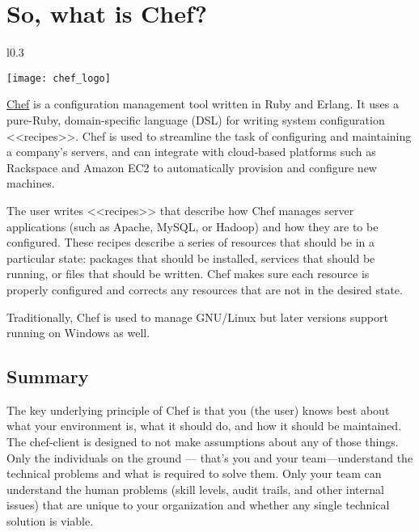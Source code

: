 \chapter{So, what is Chef?}

\begin{wrapfigure}{l}{0.3\textwidth}
  \vspace{-20pt}
  \begin{center}
    \texttt{[image: chef\_logo]}
  \end{center}
  \vspace{-20pt}
\end{wrapfigure}

\href{http://www.getchef.com/}{Chef} is a configuration management tool written in Ruby and Erlang. It uses a pure-Ruby, domain-specific language (DSL) for writing system configuration <<recipes>>. Chef is used to streamline the task of configuring and maintaining a company's servers, and can integrate with cloud-based platforms such as Rackspace and Amazon EC2 to automatically provision and configure new machines.

The user writes <<recipes>> that describe how Chef manages server applications (such as Apache, MySQL, or Hadoop) and how they are to be configured. These recipes describe a series of resources that should be in a particular state: packages that should be installed, services that should be running, or files that should be written. Chef makes sure each resource is properly configured and corrects any resources that are not in the desired state.

Traditionally, Chef is used to manage GNU/Linux but later versions support running on Windows as well.





\section{Summary}

The key underlying principle of Chef is that you (the user) knows best about what your environment is, what it should do, and how it should be maintained. The chef-client is designed to not make assumptions about any of those things. Only the individuals on the ground — that's you and your team—understand the technical problems and what is required to solve them. Only your team can understand the human problems (skill levels, audit trails, and other internal issues) that are unique to your organization and whether any single technical solution is viable.

